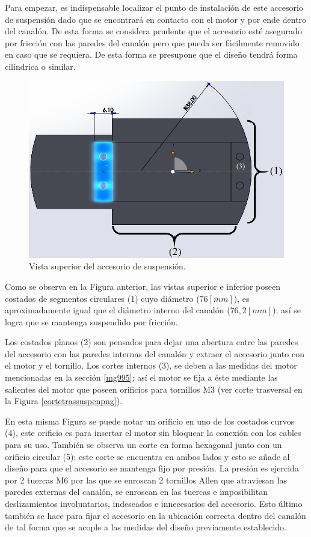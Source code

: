 Para empezar, es indispensable localizar el punto de instalación de este accesorio de suspensión dado que se encontrará en contacto con el motor y por ende dentro del canalón. De esta forma se considera prudente que el accesorio esté asegurado por fricción con las paredes del canalón pero que pueda ser fácilmente removido en caso que se requiera. De esta forma se presupone que el diseño tendrá forma cilíndrica o similar.

\begin{figure}[H]
    \begin{center}
    	\includegraphics[scale=0.45]{img/suspensorvistasup.png}
    \end{center}
    \caption{Vista superior del accesorio de suspensión.}
\end{figure}

Como se observa en la Figura anterior, las vistas superior e inferior poseen costados de segmentos circulares (1) cuyo diámetro ($76[mm]$), es aproximadamente igual que el diámetro interno del canalón ($76,2[mm]$); así se logra que se mantenga suspendido por fricción.

Los costados planos (2) son pensados para dejar una abertura entre las paredes del accesorio con las paredes internas del canalón y extraer el accesorio junto con el motor y el tornillo. Los cortes internos (3), se deben a las medidas del motor mencionadas en la sección \ref{mg995}; así el motor se fija a éste mediante las salientes del motor que poseen orificios para tornillos M3 (ver corte trasversal en la Figura \ref{cortetrassuspenpng}). 

En esta misma Figura se puede notar un orificio en uno de los costados curvos (4), este orificio es para insertar el motor sin bloquear la conexión con los cables para su uso. También se observa un corte en forma hexagonal junto con un orificio circular (5); este corte se encuentra en ambos lados y esto se añade al diseño para que el accesorio se mantenga fijo por presión. 
La presión es ejercida por 2 tuercas M6 por las que se enroscan 2 tornillos Allen que atraviesan las paredes externas del canalón, se enroscan en las tuercas e imposibilitan deslizamientos involuntarios, indeseados e innecesarios del accesorio. Esto último también se hace para fijar el accesorio en la ubicación correcta dentro del canalón de tal forma que se acople a las medidas del diseño previamente establecido.

